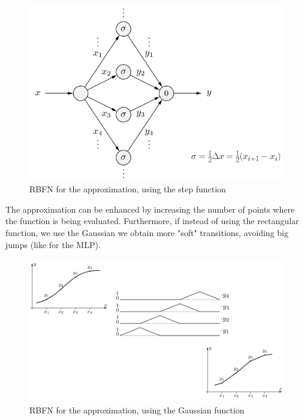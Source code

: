 \documentclass{article}
\begin{document}
\begin{figure}
    \centering
    \includegraphics[scale=0.5]{images/nn_funcapprox_rbfn.png}
    \caption{RBFN for the approximation, using the step function}
\end{figure}
The approximation can be enhanced by increasing the number of points where the function is
being evaluated. Furthermore, if instead of using the rectangular function, we
use the Gaussian we obtain more "soft" transitions, avoiding big jumps (like for the MLP).
\begin{figure}[H]
    \centering
    \includegraphics[scale=0.4]{images/gaussian_rbfn.png}
    \caption{RBFN for the approximation, using the Gaussian function}
\end{figure}
\end{document}

